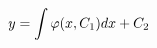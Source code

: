 \documentclass[preview]{standalone}
\begin{document}
\begin{align*}
\special{dvisvgm:raw <g id='unique000'>}y = \int \varphi(x, C_1) dx + C_2\special{dvisvgm:raw </g>}
\end{align*}
\end{document}
